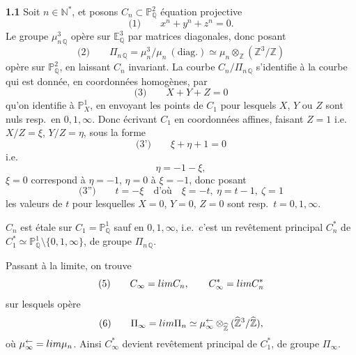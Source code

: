 \documentclass[11pt,a4paper]{article}
\begin{document}
\textbf{1.1} Soit $n \in \mathbb{N}^{*}$, et posons $C_n \subset \mathbb{P}^{2}_{\mathbb{Q}}$ équation projective
\[
  \text{(1)} \qquad x^{n} + y^{n} + z^{n} = 0 .
\]
Le groupe $\mu^{3}_{n\,\mathbb{Q}}$ opère sur $\mathbb{E}^{3}_{\mathbb{Q}}$ par matrices diagonales, donc posant
\[
  \text{(2)} \qquad \Pi_{n\,\mathbb{Q}} = \mu_n^{3}/\mu_n \ (\text{diag.}) \simeq \mu_n \otimes_{\mathbb{Z}} (\mathbb{Z}^{3}/\mathbb{Z})
\]
opère sur $\mathbb{P}^{2}_{\mathbb{Q}}$, en laissant $C_n$ invariant. La courbe $C_n/\Pi_{n\,\mathbb{Q}}$ s'identifie à la courbe  qui est donnée, en coordonnées homogènes, par
\[
  \text{(3)} \qquad X + Y + Z = 0
\]
qu'on identifie à $\mathbb{P}^{1}_{X}$, en envoyant les points de $C_1$ pour lesquels $X$, $Y$ ou $Z$ sont nuls resp.\ en $0, 1, \infty$. Donc écrivant $C_1$ en coordonnées affines, faisant $Z = 1$ i.e.\ $X/Z = \xi$, $Y/Z = \eta$, sous la forme
\[
  \text{(3')} \qquad \xi + \eta + 1 = 0
\]
i.e.
\[
  \eta = -1 - \xi ,
\]
$\xi = 0$ correspond à $\eta = -1$, $\eta = 0$ à $\xi = -1$, donc posant
\[
  \text{(3'')} \qquad t = -\xi \quad \text{d'où} \quad \xi = -t, \ \eta = t - 1, \ \zeta = 1
\]
les valeurs de $t$ pour lesquelles $X = 0$, $Y = 0$, $Z = 0$ sont resp.\ $t = 0, 1, \infty$.

$C_n$ est étale sur $C_1 = \mathbb{P}^{1}_{\mathbb{Q}}$ sauf en $0, 1, \infty$, i.e.\ c'est un revêtement principal $C_n^{*}$ de $C_1^{*} \simeq \mathbb{P}^{1}_{\mathbb{Q}} \setminus \{0, 1, \infty\}$, de groupe $\Pi_{n\,\mathbb{Q}}$.


Passant à la limite, on trouve
\[
  \text{(5)} \qquad C_\infty = \varprojlim C_n, \qquad C_\infty^{*} = \varprojlim C_n^{*}
\]
sur lesquels opère
\[
  \text{(6)} \qquad \Pi_\infty = \varprojlim \Pi_n \simeq \mu^{\leftarrow}_\infty \otimes_{\widehat{\mathbb{Z}}} (\widehat{\mathbb{Z}}^{3}/\widehat{\mathbb{Z}}) ,
\]
où $\mu^{\leftarrow}_\infty = \varprojlim \mu_n$. Ainsi $C_\infty^{*}$ devient revêtement principal de $C_1^{*}$, de groupe $\Pi_\infty$.
\end{document}
